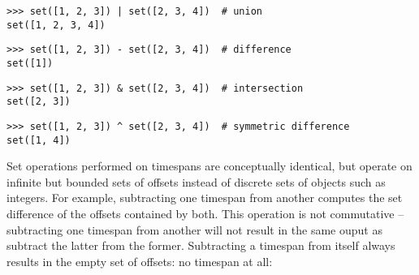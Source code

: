 \begin{comment}
<abjad>
set([1, 2, 3]) | set([2, 3, 4])  # union
set([1, 2, 3]) - set([2, 3, 4])  # difference
set([1, 2, 3]) & set([2, 3, 4])  # intersection
set([1, 2, 3]) ^ set([2, 3, 4])  # symmetric difference
</abjad>
\end{comment}

\begin{singlespacing}
\vspace{-0.5\baselineskip}
\begin{lstlisting}
>>> set([1, 2, 3]) | set([2, 3, 4])  # union
set([1, 2, 3, 4])
\end{lstlisting}
\begin{lstlisting}
>>> set([1, 2, 3]) - set([2, 3, 4])  # difference
set([1])
\end{lstlisting}
\begin{lstlisting}
>>> set([1, 2, 3]) & set([2, 3, 4])  # intersection
set([2, 3])
\end{lstlisting}
\begin{lstlisting}
>>> set([1, 2, 3]) ^ set([2, 3, 4])  # symmetric difference
set([1, 4])
\end{lstlisting}
\end{singlespacing}

\noindent Set operations performed on timespans are conceptually identical, but
operate on infinite but bounded sets of offsets instead of discrete sets of
objects such as integers. For example, subtracting one timespan from another
computes the set difference of the offsets contained by both. This operation is
not commutative -- subtracting one timespan from another will not result in the
same ouput as subtract the latter from the former. Subtracting a timespan from
itself always results in the empty set of offsets: no timespan at all:

\begin{comment}
<abjad>
result = timespantools.Timespan(0, 10) - timespantools.Timespan(0, 10)
print(format(result))
result = timespantools.Timespan(0, 10) - timespantools.Timespan(5, 15)
print(format(result))
result = timespantools.Timespan(0, 10) - timespantools.Timespan(10, 20)
print(format(result))
result = timespantools.Timespan(5, 15) - timespantools.Timespan(0, 10)
print(format(result))
result = timespantools.Timespan(5, 15) - timespantools.Timespan(5, 15)
print(format(result))
result = timespantools.Timespan(5, 15) - timespantools.Timespan(10, 20)
print(format(result))
result = timespantools.Timespan(10, 20) - timespantools.Timespan(0, 10)
print(format(result))
result = timespantools.Timespan(10, 20) - timespantools.Timespan(5, 15)
print(format(result))
result = timespantools.Timespan(10, 20) - timespantools.Timespan(10, 20)
print(format(result))
</abjad>
\end{comment}

